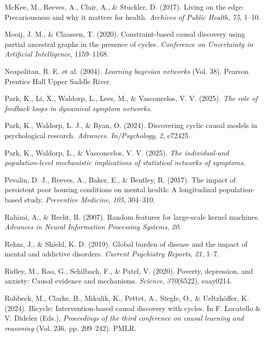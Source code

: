 \documentclass[
]{article}
\newlength{\cslhangindent}
\newenvironment{CSLReferences}[2] %
 {\begin{list}{}{%
  \setlength{\itemindent}{0pt}
  \setlength{\leftmargin}{0pt}
  \setlength{\parsep}{0pt}
  \ifodd #1
   \setlength{\leftmargin}{\cslhangindent}
   \setlength{\itemindent}{-1\cslhangindent}
  \fi
  \setlength{\itemsep}{#2\baselineskip}}}
 {\end{list}}
\begin{document}
\begin{CSLReferences}{1}{0}
McKee, M., Reeves, A., Clair, A., \& Stuckler, D. (2017). Living on the
edge: Precariousness and why it matters for health. \emph{Archives of
Public Health}, \emph{75}, 1--10.

Mooij, J. M., \& Claassen, T. (2020). Constraint-based causal discovery
using partial ancestral graphs in the presence of cycles.
\emph{Conference on Uncertainty in Artificial Intelligence}, 1159--1168.

Neapolitan, R. E. et al. (2004). \emph{Learning bayesian networks} (Vol.
38). Pearson Prentice Hall Upper Saddle River.

Park, K., Li, X., Waldorp, L., Lees, M., \& Vasconcelos, V. V. (2025).
\emph{The role of feedback loops in dynamical symptom networks}.

Park, K., Waldorp, L. J., \& Ryan, O. (2024). Discovering cyclic causal
models in psychological research. \emph{Advances. In/Psychology},
\emph{2}, e72425.

Park, K., Waldorp, L., \& Vasconcelos, V. V. (2025). \emph{The
individual-and population-level mechanistic implications of statistical
networks of symptoms}.

Pevalin, D. J., Reeves, A., Baker, E., \& Bentley, R. (2017). The impact
of persistent poor housing conditions on mental health: A longitudinal
population-based study. \emph{Preventive Medicine}, \emph{105},
304--310.

Rahimi, A., \& Recht, B. (2007). Random features for large-scale kernel
machines. \emph{Advances in Neural Information Processing Systems},
\emph{20}.

Rehm, J., \& Shield, K. D. (2019). Global burden of disease and the
impact of mental and addictive disorders. \emph{Current Psychiatry
Reports}, \emph{21}, 1--7.

Ridley, M., Rao, G., Schilbach, F., \& Patel, V. (2020). Poverty,
depression, and anxiety: Causal evidence and mechanisms. \emph{Science},
\emph{370}(6522), eaay0214.

Rohbeck, M., Clarke, B., Mikulik, K., Pettet, A., Stegle, O., \&
Ueltzhöffer, K. (2024). Bicycle: Intervention-based causal discovery
with cycles. In F. Locatello \& V. Didelez (Eds.), \emph{Proceedings of
the third conference on causal learning and reasoning} (Vol. 236, pp.
209--242). PMLR.


\end{CSLReferences}
\end{document}
